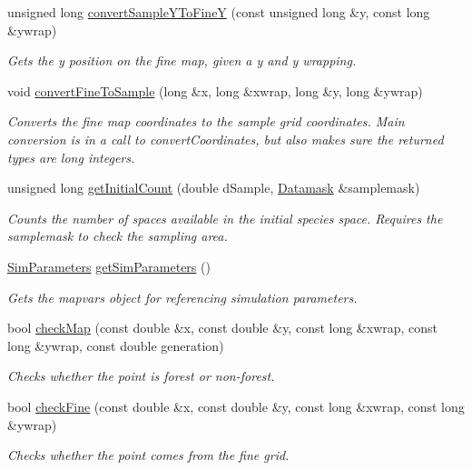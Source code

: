 \begin{DoxyCompactItemize}
unsigned long \hyperlink{class_map_a69ba72442bd3cbf7ee892ea0d2b6e4a1}{convert\+Sample\+Y\+To\+FineY} (const unsigned long \&y, const long \&ywrap)
\begin{DoxyCompactList}\small\item\em Gets the y position on the fine map, given a y and y wrapping. \end{DoxyCompactList}\item 
void \hyperlink{class_map_abd472c52b8aa58027621187de4a65683}{convert\+Fine\+To\+Sample} (long \&x, long \&xwrap, long \&y, long \&ywrap)
\begin{DoxyCompactList}\small\item\em Converts the fine map coordinates to the sample grid coordinates. Main conversion is in a call to convert\+Coordinates, but also makes sure the returned types are long integers. \end{DoxyCompactList}\item 
unsigned long \hyperlink{class_map_ad5a611be56ff6dc834dac93e91644f8e}{get\+Initial\+Count} (double d\+Sample, \hyperlink{class_datamask}{Datamask} \&samplemask)
\begin{DoxyCompactList}\small\item\em Counts the number of spaces available in the initial species space. Requires the samplemask to check the sampling area. \end{DoxyCompactList}\item 
\hyperlink{struct_sim_parameters}{Sim\+Parameters} \hyperlink{class_map_ac560f241eb5a392d2599e11b00328964}{get\+Sim\+Parameters} ()
\begin{DoxyCompactList}\small\item\em Gets the mapvars object for referencing simulation parameters. \end{DoxyCompactList}\item 
bool \hyperlink{class_map_ac5e842ad3f8d76f2293a6b1be44071ca}{check\+Map} (const double \&x, const double \&y, const long \&xwrap, const long \&ywrap, const double generation)
\begin{DoxyCompactList}\small\item\em Checks whether the point is forest or non-\/forest. \end{DoxyCompactList}\item 
bool \hyperlink{class_map_aae9663c2b5bb78e89e2c476d1d1a409b}{check\+Fine} (const double \&x, const double \&y, const long \&xwrap, const long \&ywrap)
\begin{DoxyCompactList}\small\item\em Checks whether the point comes from the fine grid. \end{DoxyCompactList}\item 

\end{DoxyCompactItemize}
